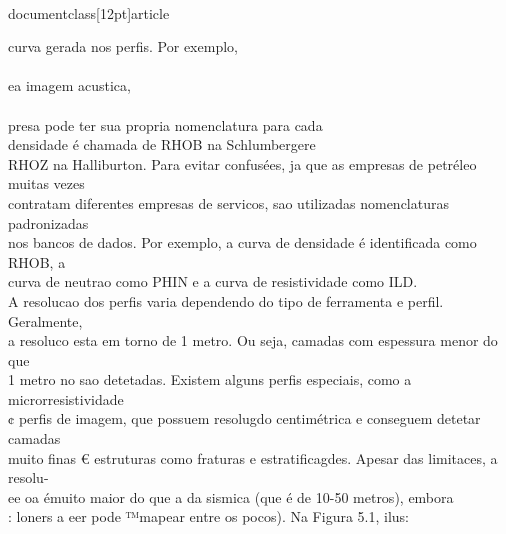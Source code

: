 \\documentclass[12pt]{article}
\begin{document}
curva gerada nos perfis. Por exemplo,\\
\\
ea imagem acustica,\\
\\
presa pode ter sua propria nomenclatura para cada\\
densidade é chamada de RHOB na Schlumbergere\\
RHOZ na Halliburton. Para evitar confusées, ja que as empresas de petréleo muitas vezes\\
contratam diferentes empresas de servicos, sao utilizadas nomenclaturas padronizadas\\
nos bancos de dados. Por exemplo, a curva de densidade é identificada como RHOB, a\\
curva de neutrao como PHIN e a curva de resistividade como ILD.\\
A resolucao dos perfis varia dependendo do tipo de ferramenta e perfil. Geralmente,\\
a resoluco esta em torno de 1 metro. Ou seja, camadas com espessura menor do que\\
1 metro no sao detetadas. Existem alguns perfis especiais, como a microrresistividade\\
¢ perfis de imagem, que possuem resolugdo centimétrica e conseguem detetar camadas\\
muito finas € estruturas como fraturas e estratificagdes. Apesar das limitaces, a resolu-\\
ee oa émuito maior do que a da sismica (que é de 10-50 metros), embora\\
: loners a eer pode ™mapear entre os pocos). Na Figura 5.1, ilus:\\
\end{document}
